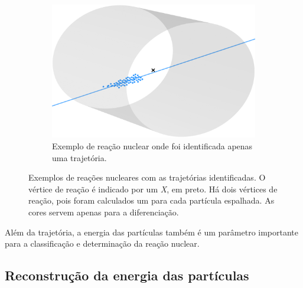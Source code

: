 \documentclass[a4paper,12pt,oneside]{book}
\begin{document}
\begin{figure}[H]
\begin{subfigure}[t]{0.45\textwidth}
        \includegraphics[scale=0.5, width=.95\columnwidth]{figs/results_ex_1_track_num_220.png}
        \caption{Exemplo de reação nuclear onde foi identificada apenas uma trajetória.}
        \label{subfig:res_exemplo_1_track}
    \end{subfigure}
\caption{Exemplos de reações nucleares com as trajetórias identificadas. O vértice de reação é indicado por um \textit{X}, em preto. Há dois vértices de reação, pois foram calculados um para cada partícula espalhada. As cores servem apenas para a diferenciação.}
\label{fig:res_tracks}
\end{figure}


\par Além da trajetória, a energia das partículas também é um parâmetro importante para a classificação e determinação da reação nuclear.

\subsection{Reconstrução da energia das partículas}

\end{document}
